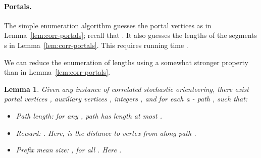 \documentclass[11pt,letterpaper]{article}
\newtheorem{lemma}[theorem]{Lemma}
\numberwithin{algorithm}{section}
\begin{document}
\paragraph{Portals.}
The simple enumeration algorithm guesses the  portal vertices  as in Lemma~\ref{lem:corr-portals}; recall that . It also guesses the lengths  of the segments s in Lemma~\ref{lem:corr-portals}. This requires running time .

We can reduce the enumeration of lengths using a somewhat stronger property than in Lemma~\ref{lem:corr-portals}.

\begin{lemma}\label{lem:corr-enum}
Given any instance of correlated stochastic orienteering, there exist portal vertices , auxiliary vertices , integers , and for each  a - path , such that:
\begin{itemize}
\item Path length: for any , path  has  length at most .
\item Reward: . Here,  is the distance to vertex  from  along path .
\item Prefix mean size: , for all . Here .
\end{itemize}
\end{lemma}
\end{document}
